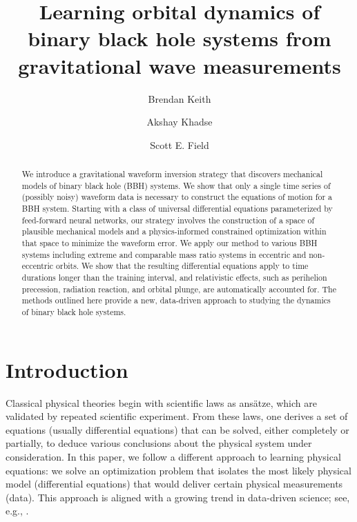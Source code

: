 \documentclass[ reprint,
nofootinbib,
 amsmath,amssymb,
 aps,
]{revtex4-2}
\begin{document}
\title{Learning orbital dynamics of binary black hole systems from\\ gravitational wave measurements}
\author{Brendan Keith}
\author{Akshay Khadse}
\author{Scott E. Field}

\begin{abstract}
We introduce a gravitational waveform inversion strategy that discovers mechanical models of binary black hole (BBH) systems. We show that only a single time series of (possibly noisy) waveform data is necessary to construct the equations of motion for a BBH system. Starting with a class of universal differential equations parameterized by feed-forward neural networks, our strategy involves the construction of a space of plausible mechanical models and a physics-informed constrained optimization within that space to minimize the waveform error.  We apply our method to various BBH systems including extreme and comparable mass ratio systems in eccentric and non-eccentric orbits. We show that the resulting differential equations apply to time durations longer than the training interval, and relativistic effects, such as perihelion precession, radiation reaction, and orbital plunge, are automatically accounted for. The methods outlined here provide a new, data-driven approach to studying the dynamics of binary black hole systems.
\end{abstract}
\maketitle

\section{Introduction} \label{sec:introduction}

Classical physical theories begin with scientific laws as ans\"atze, which are validated by repeated scientific experiment.
From these laws, one derives a set of equations (usually differential equations) that can be solved, either completely or partially, to deduce various conclusions about the physical system under consideration.
In this paper, we follow a different approach to 
learning physical equations: we solve an optimization problem that isolates the most likely physical model (differential equations) that would deliver certain physical measurements (data).
This approach is aligned with a growing trend in data-driven science; see, e.g., \cite{crutchfield1987equations,brunton2016discovering,raissi2018hidden,chen2018neural,long2018pde,han2019uniformly,wu2019numerical,rackauckas2020universal,huang2020learning,pmlr-v107-sun20a,yazdani2020systems,dandekar2020bayesian}.
\end{document}
